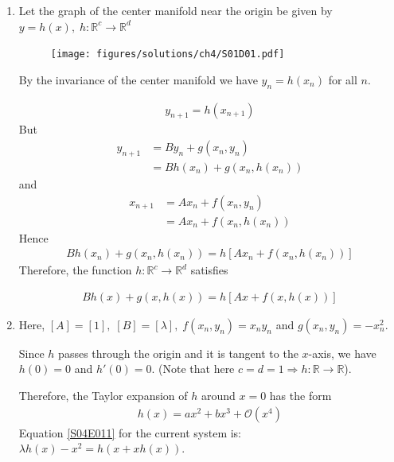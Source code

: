 \begin{solution}[4.1]
\begin{enumerate}
\item Let the graph of the center manifold near the origin be given by $y = h(x), \; h:\mathbb{R}^c \rightarrow \mathbb{R}^d$
\begin{figure}[h]
	\centering
	\texttt{[image: figures/solutions/ch4/S01D01.pdf]}
\end{figure}
By the invariance of the center manifold we have $y_n = h(x_n)$ for all $n$.

\begin{align}
	y_{n+1} = h(x_{n+1})
\end{align}
But
\begin{align}
	y_{n+1} &= By_n + g(x_n, y_n) \\
	&= Bh(x_n) + g(x_n, h(x_n))
\end{align}
and
\begin{align}
	x_{n+1} &= Ax_n + f(x_n, y_n) \\
	&= Ax_n + f(x_n, h(x_n))
\end{align}
Hence
\begin{align}
	Bh(x_n) + g(x_n, h(x_n)) = h[Ax_n + f(x_n, h(x_n))]
\end{align}
Therefore, the function $h:\mathbb{R}^c \rightarrow \mathbb{R}^d$ satisfies

\begin{align}\label{S04E011}\boxed{
		Bh(x) + g(x, h(x)) = h[Ax + f(x, h(x))]
	}
\end{align}


\item Here, $[A] = [1],\; [B] = [\lambda], \; f(x_n,y_n) = x_ny_n$ and $g(x_n, y_n)=-x_n^2$.

Since $h$ passes through the origin and it is tangent to the $x$-axis, we have $h(0)=0$ and $h'(0)=0$. (Note that here $c=d=1 \Rightarrow h:\mathbb{R} \rightarrow \mathbb{R}$).

Therefore, the Taylor expansion of $h$ around $x=0$ has the form
\begin{align}\label{S04E012}
	h(x) = ax^2 + bx^3 + \mathcal{O}(x^4)
\end{align}
Equation \eqref{S04E011} for the current system is: $\lambda h(x) - x^2 = h(x + xh(x))$.


\end{enumerate}
\end{solution}

